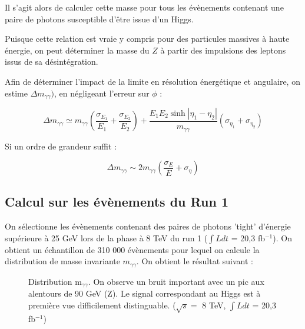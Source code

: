 \documentclass[11pt]{article} %
\begin{document}
Il s'agit alors de calculer cette masse pour tous les évènements contenant une paire de photons susceptible d'être issue d'un Higgs. 

Puisque cette relation est vraie y compris pour des particules massives à haute énergie, on peut déterminer la masse du $Z$ à partir des impulsions des leptons issus de sa désintégration.

Afin  de déterminer l'impact de la limite en résolution énergétique et angulaire, on estime $\Delta m_{\gamma\gamma})$, en négligeant l'erreur sur $\phi$ :

\begin{equation}
\Delta m_{\gamma\gamma} \simeq m_{\gamma \gamma}\left( \dfrac{\sigma_{E_1}}{E_1} +  \dfrac{\sigma_{E_2}}{E_2}\right) + \dfrac{E_1E_2 \sinh {|\eta_1 - \eta_2|}}{m_{\gamma \gamma}} \left( \sigma_{\eta_1} + \sigma_{\eta_2} \right)
\end{equation}

Si un ordre de grandeur suffit :

\begin{equation}
\Delta m_{\gamma\gamma} \sim 2m_{\gamma \gamma}\left ( \dfrac{\sigma_E}{E} +  \sigma_{\eta} \right )
\end{equation}

\subsection{Calcul sur les évènements du Run 1}

On sélectionne les évènements contenant des paires de photons 'tight' d'énergie supérieure à 25 GeV lors de la phase à 8 TeV du run 1 ($\int L dt$ = 20,3 fb$^{-1}$).
On obtient un échantillon de 310 000 évènements pour lequel on calcule la distribution de masse invariante $m_{\gamma \gamma}$. On obtient le résultat suivant :

\begin{figure}[H]
\centering
  \caption{Distribution m$_{\gamma \gamma}$. On observe un bruit important avec un pic aux alentours de 90 GeV (Z). Le signal correspondant au Higgs est à première vue difficilement distinguable. ($\sqrt{s} =$ 8 TeV,  $\int L dt$ = 20,3 fb$^{-1}$) }
 \resizebox{.9\linewidth}{!}{}
\end{figure}
\end{document}
